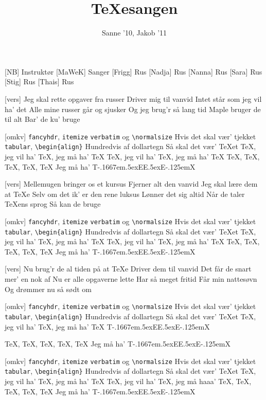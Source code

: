 \documentclass[a4paper,11pt]{article}
\title{TeXesangen}
\author{Sanne '10, Jakob '11}
\makeatletter
\DeclareRobustCommand\TeeeX{%
T\kern-.1667em\lower.5ex\hbox{E}E\raise.5ex\hbox{E}\kern-.125emX\@%
}
\makeatother
\begin{document}
\maketitle

\begin{roles}
[NB] Instruktør
[MaWeK] Sanger
[Frigg] Rus
[Nadja] Rus
[Nanna] Rus
[Sara] Rus
[Stig] Rus
[Thais] Rus
\end{roles}

\begin{song}
[vers]%
Jeg skal rette opgaver fra russer
Driver mig til vanvid 
Intet står som jeg vil ha' det
Alle mine russer går og sjusker
Og jeg brug'r så lang tid
Maple bruger de til alt
Bar' de ku' bruge

[omkv]%
\texttt{fancyhdr}, \texttt{itemize}
\texttt{verbatim} og \texttt{\textbackslash{}normalsize}
Hvis det skal vær' tjekket
\texttt{tabular}, \texttt{\textbackslash{}begin\{align\}}
Hundredvis af dollartegn
Så skal det vær' \TeX{}et
\TeX, jeg vil ha' \TeX, jeg må ha' \TeX
\TeX, jeg vil ha' \TeX, jeg må ha' \TeX
\TeX, \TeX, \TeX, \TeX, \TeX
Jeg må ha' \TeeeX

[vers]%
Mellemugen bringer os et kursus
Fjerner alt den vanvid
Jeg skal lære dem at \TeX{}e
Selv om det ik' er den rene luksus 
Lønner det sig altid
Når de taler \TeX{}ens sprog
Så kan de bruge

[omkv]%
\texttt{fancyhdr}, \texttt{itemize}
\texttt{verbatim} og \texttt{\textbackslash{}normalsize}
Hvis det skal vær' tjekket
\texttt{tabular}, \texttt{\textbackslash{}begin\{align\}}
Hundredvis af dollartegn
Så skal det vær' \TeX{}et
\TeX, jeg vil ha' \TeX, jeg må ha' \TeX
\TeX, jeg vil ha' \TeX, jeg må ha' \TeX
\TeX, \TeX, \TeX, \TeX, \TeX
Jeg må ha' \TeeeX

[vers]%
Nu brug'r de al tiden på at \TeX{}e
Driver dem til vanvid
Det får de snart mer' en nok af
Nu er alle opgaverne lette
Har så meget fritid
Får min nattesøvn
Og drømmer nu så sødt om

[omkv]%
\texttt{fancyhdr}, \texttt{itemize}
\texttt{verbatim} og \texttt{\textbackslash{}normalsize}
Hvis det skal vær' tjekket
\texttt{tabular}, \texttt{\textbackslash{}begin\{align\}}
Hundredvis af dollartegn
Så skal det vær' \TeX{}et
\TeX, jeg vil ha' \TeX, jeg må ha' \TeX
\TeeeX
\TeX, \TeX, \TeX, \TeX, \TeX
Jeg må ha' \TeeeX

[omkv]%
\texttt{fancyhdr}, \texttt{itemize}
\texttt{verbatim} og \texttt{\textbackslash{}normalsize}
Hvis det skal vær' tjekket
\texttt{tabular}, \texttt{\textbackslash{}begin\{align\}}
Hundredvis af dollartegn
Så skal det vær' \TeX{}et
\TeX, jeg vil ha' \TeX, jeg må ha' \TeX
\TeX, jeg vil ha' \TeX, jeg må haaa'
\TeX, \TeX, \TeX, \TeX, \TeX
Jeg må ha' \TeeeX
\end{song}
\end{document}
